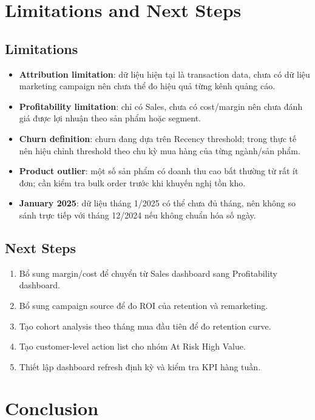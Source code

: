 \documentclass[11pt,a4paper]{article}
\begin{document}
\section{Limitations and Next Steps}

\subsection{Limitations}

\begin{itemize}
    \item \textbf{Attribution limitation}: dữ liệu hiện tại là transaction data, chưa có dữ liệu marketing campaign nên chưa thể đo hiệu quả từng kênh quảng cáo.
    \item \textbf{Profitability limitation}: chỉ có Sales, chưa có cost/margin nên chưa đánh giá được lợi nhuận theo sản phẩm hoặc segment.
    \item \textbf{Churn definition}: churn đang dựa trên Recency threshold; trong thực tế nên hiệu chỉnh threshold theo chu kỳ mua hàng của từng ngành/sản phẩm.
    \item \textbf{Product outlier}: một số sản phẩm có doanh thu cao bất thường từ rất ít đơn; cần kiểm tra bulk order trước khi khuyến nghị tồn kho.
    \item \textbf{January 2025}: dữ liệu tháng 1/2025 có thể chưa đủ tháng, nên không so sánh trực tiếp với tháng 12/2024 nếu không chuẩn hóa số ngày.
\end{itemize}

\subsection{Next Steps}

\begin{enumerate}
    \item Bổ sung margin/cost để chuyển từ Sales dashboard sang Profitability dashboard.
    \item Bổ sung campaign source để đo ROI của retention và remarketing.
    \item Tạo cohort analysis theo tháng mua đầu tiên để đo retention curve.
    \item Tạo customer-level action list cho nhóm At Risk High Value.
    \item Thiết lập dashboard refresh định kỳ và kiểm tra KPI hàng tuần.
\end{enumerate}

\section{Conclusion}
\end{document}
